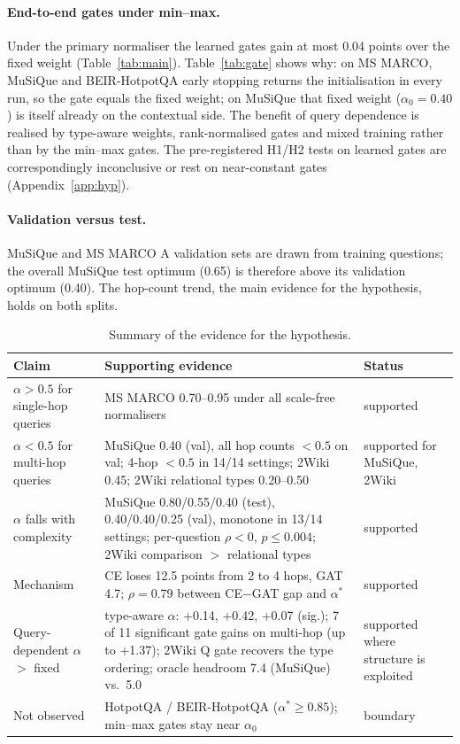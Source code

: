 \documentclass[11pt]{article}
\newcommand{\gate}[1]{\textsc{#1}}
\begin{document}
\paragraph{End-to-end gates under min--max.} Under the primary normaliser the learned gates gain at most
0.04 points over the fixed weight (Table~\ref{tab:main}). Table~\ref{tab:gate} shows why: on MS MARCO,
MuSiQue and BEIR-HotpotQA early stopping returns the initialisation in every run, so the gate equals the
fixed weight; on MuSiQue that fixed weight ($\alpha_0=0.40$) is itself already on the contextual side.
The benefit of query dependence is realised by type-aware weights, rank-normalised gates and mixed
training rather than by the min--max gates. The pre-registered H1/H2 tests on learned gates are
correspondingly inconclusive or rest on near-constant gates (Appendix~\ref{app:hyp}).

\paragraph{Validation versus test.} MuSiQue and MS MARCO A validation sets are drawn from training
questions; the overall MuSiQue test optimum (0.65) is therefore above its validation optimum (0.40).
The hop-count trend, the main evidence for the hypothesis, holds on both splits.

\begin{table}[t]
\centering\small\setlength{\tabcolsep}{4pt}
\begin{tabular}{p{3.6cm}p{8.6cm}p{2.7cm}}
\toprule
Claim & Supporting evidence & Status \\
\midrule
$\alpha>0.5$ for single-hop queries & MS MARCO 0.70--0.95 under all scale-free normalisers & supported \\
$\alpha<0.5$ for multi-hop queries & MuSiQue 0.40 (val), all hop counts $<0.5$ on val; 4-hop $<0.5$ in 14/14 settings; 2Wiki 0.45; 2Wiki relational types 0.20--0.50 & supported for MuSiQue, 2Wiki \\
$\alpha$ falls with complexity & MuSiQue 0.80/0.55/0.40 (test), 0.40/0.40/0.25 (val), monotone in 13/14 settings; per-question $\rho<0$, $p\le0.004$; 2Wiki comparison $>$ relational types & supported \\
Mechanism & CE loses 12.5 points from 2 to 4 hops, GAT 4.7; $\rho=0.79$ between CE$-$GAT gap and $\alpha^*$ & supported \\
Query-dependent $\alpha$ $>$ fixed & type-aware $\alpha$: +0.14, +0.42, +0.07 (sig.); 7 of 11 significant gate gains on multi-hop (up to +1.37); 2Wiki \gate{Q} gate recovers the type ordering; oracle headroom 7.4 (MuSiQue) vs.\ 5.0 & supported where structure is exploited \\
Not observed & HotpotQA / BEIR-HotpotQA ($\alpha^*\ge0.85$); min--max gates stay near $\alpha_0$ & boundary \\
\bottomrule
\end{tabular}
\caption{Summary of the evidence for the hypothesis.}
\label{tab:verdict}
\end{table}
\end{document}

